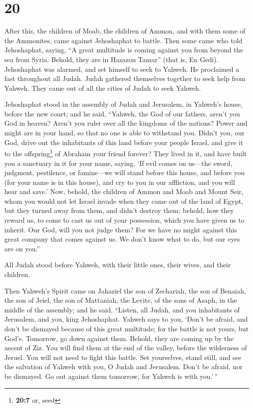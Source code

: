 \hypertarget{section-19}{%
\section{20}\label{section-19}}

 After this, the children of Moab, the children of Ammon,
and with them some of the Ammonites, came against Jehoshaphat to battle.
 Then some came who told Jehoshaphat, saying, ``A great
multitude is coming against you from beyond the sea from Syria. Behold,
they are in Hazazon Tamar'' (that is, En Gedi). 
Jehoshaphat was alarmed, and set himself to seek to Yahweh. He
proclaimed a fast throughout all Judah.  Judah gathered
themselves together to seek help from Yahweh. They came out of all the
cities of Judah to seek Yahweh.

 Jehoshaphat stood in the assembly of Judah and Jerusalem,
in Yahweh's house, before the new court;  and he said,
``Yahweh, the God of our fathers, aren't you God in heaven? Aren't you
ruler over all the kingdoms of the nations? Power and might are in your
hand, so that no one is able to withstand you.  Didn't
you, our God, drive out the inhabitants of this land before your people
Israel, and give it to the offspring\footnote{\textbf{20:7} or, seed} of
Abraham your friend forever?  They lived in it, and have
built you a sanctuary in it for your name, saying,  `If
evil comes on us---the sword, judgment, pestilence, or famine---we will
stand before this house, and before you (for your name is in this
house), and cry to you in our affliction, and you will hear and save.'
 Now, behold, the children of Ammon and Moab and Mount
Seir, whom you would not let Israel invade when they came out of the
land of Egypt, but they turned away from them, and didn't destroy them;
 behold, how they reward us, to come to cast us out of
your possession, which you have given us to inherit.  Our
God, will you not judge them? For we have no might against this great
company that comes against us. We don't know what to do, but our eyes
are on you.''

 All Judah stood before Yahweh, with their little ones,
their wives, and their children.

 Then Yahweh's Spirit came on Jahaziel the son of
Zechariah, the son of Benaiah, the son of Jeiel, the son of Mattaniah,
the Levite, of the sons of Asaph, in the middle of the assembly;
 and he said, ``Listen, all Judah, and you inhabitants of
Jerusalem, and you, king Jehoshaphat. Yahweh says to you, `Don't be
afraid, and don't be dismayed because of this great multitude; for the
battle is not yours, but God's.  Tomorrow, go down
against them. Behold, they are coming up by the ascent of Ziz. You will
find them at the end of the valley, before the wilderness of Jeruel.
 You will not need to fight this battle. Set yourselves,
stand still, and see the salvation of Yahweh with you, O Judah and
Jerusalem. Don't be afraid, nor be dismayed. Go out against them
tomorrow, for Yahweh is with you.'\,''

